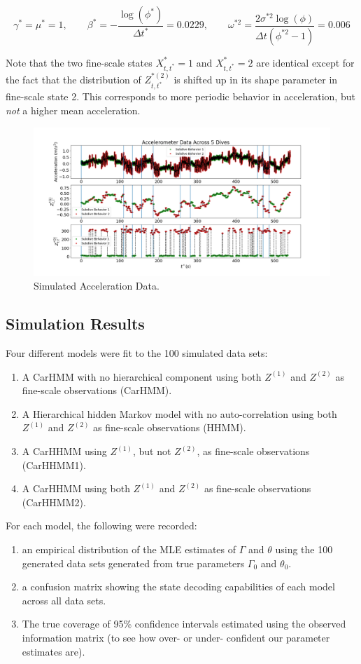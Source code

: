 $$\gamma^* = \mu^* = 1, \qquad \beta^* = -\frac{\log(\phi^*)}{\Delta t^*} = 0.0229, \qquad \omega^{*2} = \frac{2\sigma^{*2}\log(\phi)}{\Delta t (\phi^{*2}-1)} = 0.006$$

Note that the two fine-scale states $X^*_{t,t^*} = 1$ and $X^*_{t,t^*} = 2$ are identical except for the fact that the distribution of $Z^{*(2)}_{t,t^*}$ is shifted up in its shape parameter in fine-scale state 2. This corresponds to more periodic behavior in acceleration, but \textit{not} a higher mean acceleration.

\begin{figure}[!ht]
	\centering
	\includegraphics[width=5in]{../Plots/sim_data.png}
	\caption{Simulated Acceleration Data.}
	\label{fig:sim_data}
\end{figure}


\subsection{Simulation Results}

Four different models were fit to the 100 simulated data sets:

\begin{enumerate}
    \item A CarHMM with no hierarchical component using both $Z^{(1)}$ and $Z^{(2)}$ as fine-scale observations (CarHMM).
    \item A Hierarchical hidden Markov model with no auto-correlation using both $Z^{(1)}$ and $Z^{(2)}$ as fine-scale observations (HHMM).
    \item A CarHHMM using $Z^{(1)}$, but not $Z^{(2)}$, as fine-scale observations (CarHHMM1).
    \item A CarHHMM using both $Z^{(1)}$ and $Z^{(2)}$ as fine-scale observations (CarHHMM2).
\end{enumerate}
%
For each model, the following were recorded:
%
\begin{enumerate}
    \item an empirical distribution of the MLE estimates of $\Gamma$ and $\theta$ using the 100 generated data sets generated from true parameters $\Gamma_0$ and $\theta_0$.
    \item a confusion matrix showing the state decoding capabilities of each model across all data sets.
    \item The true coverage of 95\% confidence intervals estimated using the observed information matrix (to see how over- or under- confident our parameter estimates are).
\end{enumerate}


